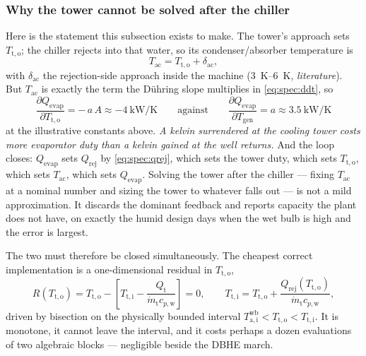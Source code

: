\documentclass[11pt]{article}
\newcommand{\md}{\ensuremath{\dot m}}
\begin{document}
\subsubsection{Why the tower cannot be solved after the chiller}
Here is the statement this subsection exists to make. The tower's approach sets $T_{\mathrm{t,o}}$;
the chiller rejects into that water, so its condenser/absorber temperature is
\begin{equation}
T_{\mathrm{ac}} = T_{\mathrm{t,o}} + \delta_{\mathrm{ac}} ,
\label{eq:spec:Tac}
\end{equation}
with $\delta_{\mathrm{ac}}$ the rejection-side approach inside the machine
(\SIrange{3}{6}{\kelvin}, \emph{literature}). But $T_{\mathrm{ac}}$ is exactly the term the D\"uhring
slope multiplies in \eqref{eq:spec:ddt}, so
\begin{equation}
\frac{\partial Q_{\mathrm{evap}}}{\partial T_{\mathrm{t,o}}} = -\,a\,A \approx
\SI{-4}{\kilo\watt\per\kelvin}
\qquad\text{against}\qquad
\frac{\partial Q_{\mathrm{evap}}}{\partial T_{\mathrm{gen}}} = a \approx
\SI{3.5}{\kilo\watt\per\kelvin}
\label{eq:spec:sens}
\end{equation}
at the illustrative constants above. \emph{A kelvin surrendered at the cooling tower costs more
evaporator duty than a kelvin gained at the well returns.} And the loop closes: $Q_{\mathrm{evap}}$
sets $Q_{\mathrm{rej}}$ by \eqref{eq:spec:qrej}, which sets the tower duty, which sets
$T_{\mathrm{t,o}}$, which sets $T_{\mathrm{ac}}$, which sets $Q_{\mathrm{evap}}$. Solving the tower
after the chiller --- fixing $T_{\mathrm{ac}}$ at a nominal number and sizing the tower to whatever
falls out --- is not a mild approximation. It discards the dominant feedback and reports capacity the
plant does not have, on exactly the humid design days when the wet bulb is high and the error is
largest.

The two must therefore be closed simultaneously. The cheapest correct implementation is a
one-dimensional residual in $T_{\mathrm{t,o}}$,
\begin{equation}
R(T_{\mathrm{t,o}}) = T_{\mathrm{t,o}}
 - \left[T_{\mathrm{t,i}} - \frac{Q_{\mathrm{t}}}{\md_{\mathrm{t}}c_{p,\mathrm{w}}}\right] = 0 ,
\qquad
T_{\mathrm{t,i}} = T_{\mathrm{t,o}} + \frac{Q_{\mathrm{rej}}(T_{\mathrm{t,o}})}
{\md_{\mathrm{t}}c_{p,\mathrm{w}}} ,
\label{eq:spec:coupled}
\end{equation}
driven by bisection on the physically bounded interval
$T_{\mathrm{a,i}}^{\mathrm{wb}} < T_{\mathrm{t,o}} < T_{\mathrm{t,i}}$. It is monotone, it cannot
leave the interval, and it costs perhaps a dozen evaluations of two algebraic blocks --- negligible
beside the DBHE march.
\end{document}
